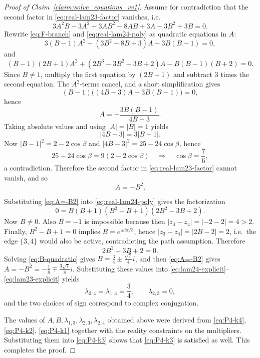 \documentclass[10pt,a4paper]{amsart}
\begin{document}
\begin{proof}[Proof of Claim~\ref{claim:solve_equations_vv1}]
Assume for contradiction that the second factor in \eqref{eq:real-lam23-factor} vanishes, i.e.
\begin{equation}\label{eq:F-branch}
3A^2B-3A^2+3AB^2-8AB+3A-3B^2+3B=0.
\end{equation}
Rewrite \eqref{eq:F-branch} and \eqref{eq:real-lam24-poly} as quadratic equations in $A$:
\[
3(B-1)A^2+(3B^2-8B+3)A-3B(B-1)=0,
\]
and
\[
(B-1)(2B+1)A^2+(2B^3-3B^2-3B+2)A-B(B-1)(B+2)=0.
\]
Since $B\neq 1$, multiply the first equation by $(2B+1)$ and subtract $3$ times the second equation.
The $A^2$-terms cancel, and a short simplification gives
\[
(B-1)\bigl((4B-3)A+3B(B-1)\bigr)=0,
\]
hence
\begin{equation}\label{eq:A-rational}
A=-\frac{3B(B-1)}{4B-3}.
\end{equation}
Taking absolute values and using $|A|=|B|=1$ yields
\[
|4B-3|=3|B-1|.
\]
Now $|B-1|^2=2-2\cos\beta$ and $|4B-3|^2=25-24\cos\beta$, hence
\[
25-24\cos\beta=9(2-2\cos\beta)\quad\Rightarrow\quad \cos\beta=\frac{7}{6},
\]
a contradiction. Therefore the second factor in \eqref{eq:real-lam23-factor} cannot vanish, and so
\begin{equation}\label{eq:A=-B2}
A=-B^2.
\end{equation}



Substituting \eqref{eq:A=-B2} into \eqref{eq:real-lam24-poly} gives the factorization
\[
0=B(B+1)(B^2-B+1)(2B^2-3B+2).
\]
Now \(B\neq 0\). Also \(B=-1\) is impossible because then
\(|z_3-z_4|=|-2-2|=4>2\).
Finally, \(B^2-B+1=0\) implies \(B=e^{\pm i\pi/3}\), hence
\(|z_3-z_4|=|2B-2|=2\), i.e.\ the edge \(\{3,4\}\) would also be active, contradicting the path assumption.
Therefore
\begin{equation}\label{eq:B-quadratic}
2B^2-3B+2=0.
\end{equation}
Solving \eqref{eq:B-quadratic} gives \(B=\frac34\pm \frac{\sqrt7}{4}i\), and then \eqref{eq:A=-B2} gives
\(A=-B^2=-\frac18\mp \frac{3\sqrt7}{8}i\).
Substituting these values into \eqref{eq:lam24-explicit}--\eqref{eq:lam23-explicit} yields
\[
\lambda_{2,4}=\lambda_{1,3}=\frac34,\qquad \lambda_{2,3}=0,
\]
and the two choices of sign correspond to complex conjugation.



The values of \(A,B,\lambda_{1,3},\lambda_{2,3},\lambda_{2,4}\) obtained above were derived from
\eqref{eq:P4-k4}, \eqref{eq:P4-k2}, \eqref{eq:P4-k1} together with the reality constraints on the multipliers.
Substituting them into \eqref{eq:P4-k3} shows that \eqref{eq:P4-k3} is satisfied as well. This completes the proof.
\end{proof}
\end{document}
